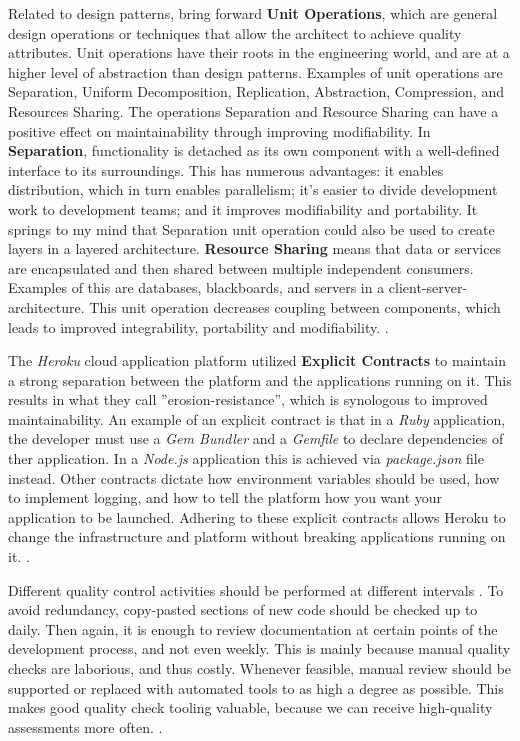 \documentclass[utf8,english]{gradu3}
\begin{document}
Related to design patterns, \textcite{Bass1998} bring forward \textbf{Unit Operations},
which are general design operations or techniques that allow the architect to
achieve quality attributes. Unit operations have their roots in the engineering
world, and are at a higher level of abstraction than design patterns. Examples
of unit operations are Separation, Uniform Decomposition, Replication,
Abstraction, Compression, and Resources Sharing. The operations Separation and
Resource Sharing can have a positive effect on maintainability through improving
modifiability. In \textbf{Separation}, functionality is detached as its own component
with a well-defined interface to its surroundings. This has numerous advantages: it
enables distribution, which in turn enables parallelism; it's easier to divide
development work to development teams; and it improves modifiability and
portability. It springs to my mind that Separation unit operation could also be
used to create layers in a layered architecture. \textbf{Resource Sharing} means that
data or services are encapsulated and then shared between multiple independent
consumers. Examples of this are databases, blackboards, and servers in a
client-server-architecture. This unit operation decreases coupling between
components, which leads to improved integrability, portability and
modifiability. \parencite[123-126]{Bass1998}.

The \textit{Heroku} cloud application platform \parencite{Heroku2011} utilized
\textbf{Explicit Contracts} to maintain a strong separation between the platform
and the applications running on it. This results in what they call
''erosion-resistance'', which is synologous to improved maintainability. An
example of an explicit contract is that in a \textit{Ruby} application, the
developer must use a \textit{Gem Bundler} and a \textit{Gemfile} to declare
dependencies of ther application. In a \textit{Node.js} application this is
achieved via \textit{package.json} file instead. Other contracts dictate how
environment variables should be used, how to implement logging, and how to tell
the platform how you want your application to be launched. Adhering to these
explicit contracts allows Heroku to change the infrastructure and platform
without breaking applications running on it. \parencite{Heroku2011}.

Different quality control activities should be performed at different intervals
\parencite[25]{Broy2006}. To avoid redundancy, copy-pasted sections of new code
should be checked up to daily. Then again, it is enough to review documentation
at certain points of the development process, and not even weekly. This is
mainly because manual quality checks are laborious, and thus costly. Whenever
feasible, manual review should be supported or replaced with automated tools to
as high a degree as possible. This makes good quality check tooling valuable,
because we can receive high-quality assessments more often.
\parencite[25]{Broy2006}.
\end{document}
